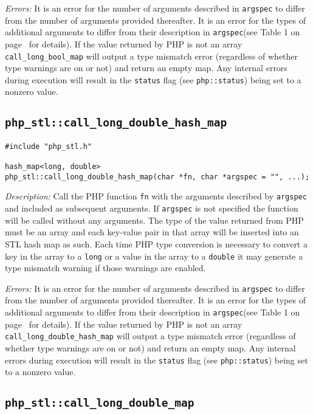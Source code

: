 \documentclass[11pt,titlepage]{article}
\begin{document}
\emph{Errors:} It is an error for the number of arguments described in \verb|argspec| to differ from the number of arguments provided thereafter. It is an error for the types of additional arguments to differ from their description in \verb|argspec|(see Table 1 on page~\pageref{Table1} for details). If the value returned by PHP is not an array \verb|call_long_bool_map| will output a type mismatch error (regardless of whether type warnings are on or not) and return an empty map. Any internal errors during execution will result in the \verb|status| flag (see \verb|php::status|) being set to a nonzero value.


\subsection{\texttt{php\_stl::call\_long\_double\_hash\_map}}

\begin{verbatim}
#include "php_stl.h"

hash_map<long, double> 
php_stl::call_long_double_hash_map(char *fn, char *argspec = "", ...);
\end{verbatim}

\emph{Description:} Call the PHP function \verb|fn| with the arguments described by \verb|argspec| and included as subsequent arguments. If \verb|argspec| is not specified the function will be called without any arguments. The type of the value returned from PHP must be an array and each key-value pair in that array will be inserted into an STL hash map as such. Each time PHP type conversion is necessary to convert a key in the array to a \verb|long| or a value in the array to a \verb|double| it may generate a type mismatch warning if those warnings are enabled.

\emph{Errors:} It is an error for the number of arguments described in \verb|argspec| to differ from the number of arguments provided thereafter. It is an error for the types of additional arguments to differ from their description in \verb|argspec|(see Table 1 on page~\pageref{Table1} for details). If the value returned by PHP is not an array \verb|call_long_double_hash_map| will output a type mismatch error (regardless of whether type warnings are on or not) and return an empty map. Any internal errors during execution will result in the \verb|status| flag (see \verb|php::status|) being set to a nonzero value.


\subsection{\texttt{php\_stl::call\_long\_double\_map}}
\end{document}
